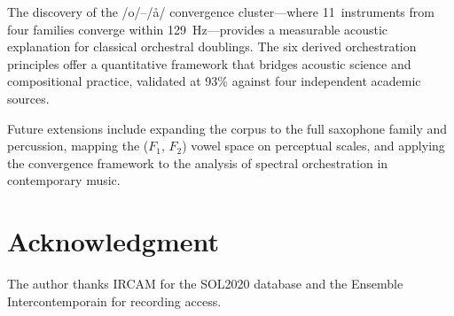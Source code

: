 \documentclass[journal]{IEEEtran}
\newcommand{\Fn}[1]{F_{#1}}
\begin{document}
The discovery of the /o/--/\aa/ convergence cluster---where 11~instruments from four families converge within \SI{129}{\hertz}---provides a measurable acoustic explanation for classical orchestral doublings. The six derived orchestration principles offer a quantitative framework that bridges acoustic science and compositional practice, validated at 93\% against four independent academic sources.

Future extensions include expanding the corpus to the full saxophone family and percussion, mapping the ($\Fn{1}$, $\Fn{2}$) vowel space on perceptual scales, and applying the convergence framework to the analysis of spectral orchestration in contemporary music.

\section*{Acknowledgment}
The author thanks IRCAM for the SOL2020 database and the Ensemble Intercontemporain for recording access.
\end{document}
